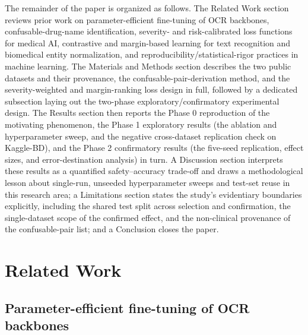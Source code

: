\documentclass[fleqn,10pt]{wlpeerj}
\begin{document}
The remainder of the paper is organized as follows. The Related Work section reviews prior work on parameter-efficient fine-tuning of OCR backbones, confusable-drug-name identification, severity- and risk-calibrated loss functions for medical AI, contrastive and margin-based learning for text recognition and biomedical entity normalization, and reproducibility/statistical-rigor practices in machine learning. The Materials and Methods section describes the two public datasets and their provenance, the confusable-pair-derivation method, and the severity-weighted and margin-ranking loss design in full, followed by a dedicated subsection laying out the two-phase exploratory/confirmatory experimental design. The Results section then reports the Phase 0 reproduction of the motivating phenomenon, the Phase 1 exploratory results (the ablation and hyperparameter sweep, and the negative cross-dataset replication check on Kaggle-BD), and the Phase 2 confirmatory results (the five-seed replication, effect sizes, and error-destination analysis) in turn. A Discussion section interprets these results as a quantified safety--accuracy trade-off and draws a methodological lesson about single-run, unseeded hyperparameter sweeps and test-set reuse in this research area; a Limitations section states the study's evidentiary boundaries explicitly, including the shared test split across selection and confirmation, the single-dataset scope of the confirmed effect, and the non-clinical provenance of the confusable-pair list; and a Conclusion closes the paper.

\section*{Related Work}\label{sec:related-work}

\subsection*{Parameter-efficient fine-tuning of OCR backbones}\label{sec:related-peft}
\end{document}
